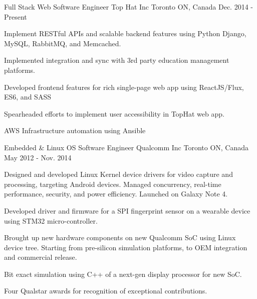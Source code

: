 

\begin{cventries}

  \cventry
    {Full Stack Web Software Engineer} %
    {Top Hat Inc} %
    {Toronto ON, Canada} %
    {Dec. 2014 - Present} %
    {
      \begin{cvitems} %
        \item {Implement RESTful APIs and scalable backend features using Python Django, MySQL, RabbitMQ, and Memcached.}
        \item {Implemented integration and sync with 3rd party education management platforms.}
        \item {Developed frontend features for rich single-page web app using ReactJS/Flux, ES6, and SASS}
		\item {Spearheaded efforts to implement user accessibility in TopHat web app.}
		\item {AWS Infrastructure automation using Ansible}
      \end{cvitems}
    }

  \cventry
    {Embedded \& Linux OS Software Engineer} %
    {Qualcomm Inc} %
    {Toronto ON, Canada} %
    {May 2012 - Nov. 2014} %
    {
      \begin{cvitems} %
        \item {Designed and developed Linux Kernel device drivers for video capture and processing, targeting Android devices. Managed concurrency, real-time performance, security, and power efficiency. Launched on Galaxy Note 4.}
		\item {Developed driver and firmware for a SPI fingerprint sensor on a wearable device using STM32 micro-controller.}
        \item {Brought up new hardware components on new Qualcomm SoC using Linux device tree. Starting from  pre-silicon simulation platforms, to OEM integration and commercial release.}
		\item {Bit exact simulation using C++ of a next-gen display processor for new SoC.}
		\item {Four Qualstar awards for recognition of exceptional contributions.}
      \end{cvitems}
    }


\end{cventries}
